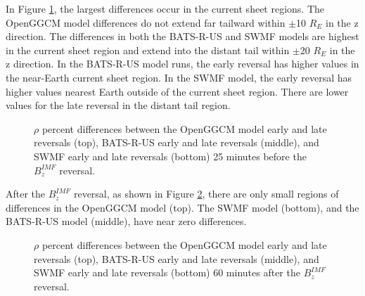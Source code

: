 In Figure \ref{fig:rhodiffPCBeforeFlip}, the largest differences occur in the
current sheet regions. The OpenGGCM model differences do not extend far
tailward within $\pm$10 $R_E$ in the z direction. The differences in both the BATS-R-US and
SWMF models are highest in the current sheet region and extend into the distant
tail within $\pm$20 $R_E$ in the z direction. In the BATS-R-US model runs, the early
reversal has higher values in the near-Earth current sheet region. In the
SWMF model, the early reversal has higher values nearest Earth outside of the
current sheet region. There are lower values for the late reversal in the
distant tail region.
\begin{figure}
	\centering
	\caption{$\rho$ percent differences between the OpenGGCM model early and late
	reversals (top), BATS-R-US early and late reversals (middle), and SWMF early
	and late reversals (bottom) 25 minutes before the $B_z^{IMF}$ reversal.}
	\figSpace
	\label{fig:rhodiffPCBeforeFlip}
\end{figure}

After the $B_z^{IMF}$ reversal, as shown in Figure \ref{fig:rhodiffPCAfterFlip}, 
there are only small regions of differences in the OpenGGCM model (top). The SWMF
model (bottom), and the BATS-R-US model (middle), have near zero differences.
\begin{figure}
	\centering
	\caption{$\rho$ percent differences between the OpenGGCM model early and late
	reversals (top), BATS-R-US early and late reversals (middle), and SWMF early
	and late reversals (bottom) 60 minutes after the $B_z^{IMF}$ reversal.}
	\figSpace
	\label{fig:rhodiffPCAfterFlip}
\end{figure}

